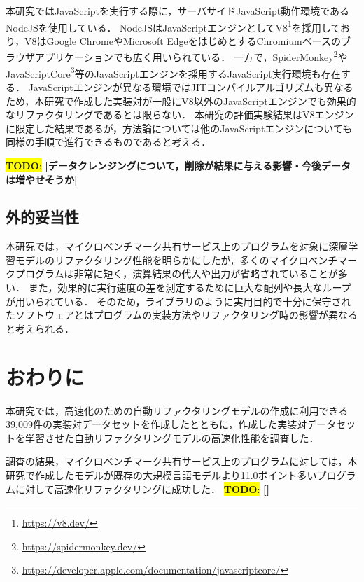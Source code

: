 \documentclass[11pt]{jreport}
\newcommand{\todo}[1]{\colorbox{yellow}{{\bf TODO}:}{\color{red} {\textbf{[#1]}}}}
\begin{document}
本研究ではJavaScriptを実行する際に，サーバサイドJavaScript動作環境であるNodeJSを使用している．
NodeJSはJavaScriptエンジンとしてV8\footnote{\url{https://v8.dev/}}を採用しており，V8はGoogle ChromeやMicrosoft EdgeをはじめとするChromiumベースのブラウザアプリケーションでも広く用いられている．
一方で，SpiderMonkey\footnote{\url{https://spidermonkey.dev/}}やJavaScriptCore\footnote{\url{https://developer.apple.com/documentation/javascriptcore/}}等のJavaScriptエンジンを採用するJavaScript実行環境も存在する．
JavaScriptエンジンが異なる環境ではJITコンパイルアルゴリズムも異なるため，本研究で作成した実装対が一般にV8以外のJavaScriptエンジンでも効果的なリファクタリングであるとは限らない．
本研究の評価実験結果はV8エンジンに限定した結果であるが，方法論については他のJavaScriptエンジンについても同様の手順で進行できるものであると考える．

\todo{データクレンジングについて，削除が結果に与える影響・今後データは増やせそうか}




\section{外的妥当性}


本研究では，マイクロベンチマーク共有サービス上のプログラムを対象に深層学習モデルのリファクタリング性能を明らかにしたが，多くのマイクロベンチマークプログラムは非常に短く，演算結果の代入や出力が省略されていることが多い．
また，効果的に実行速度の差を測定するために巨大な配列や長大なループが用いられている．
そのため，ライブラリのように実用目的で十分に保守されたソフトウェアとはプログラムの実装方法やリファクタリング時の影響が異なると考えられる．




\chapter{おわりに}\label{chapter:conc}


本研究では，高速化のための自動リファクタリングモデルの作成に利用できる39,009件の実装対データセットを作成したとともに，作成した実装対データセットを学習させた自動リファクタリングモデルの高速化性能を調査した．


調査の結果，マイクロベンチマーク共有サービス上のプログラムに対しては，本研究で作成したモデルが既存の大規模言語モデルより11.0ポイント多いプログラムに対して高速化リファクタリングに成功した．
\todo{}
\end{document}
